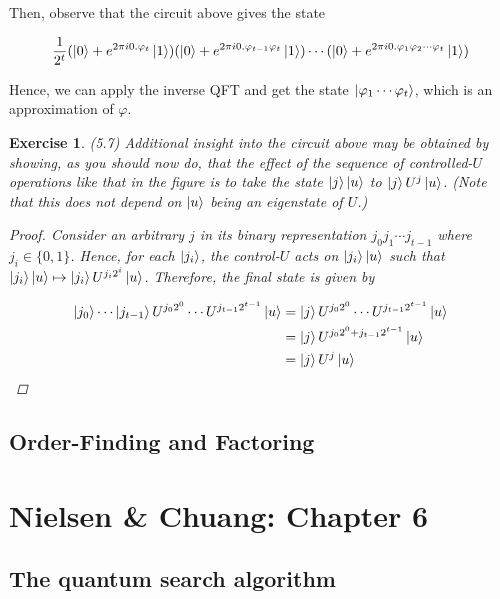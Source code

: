 \documentclass[11pt]{article}
\newcommand\0{\mathbf{0}}
\newcommand\<{\langle}
\renewcommand\>{\rangle}
\renewcommand\phi{\varphi}
\newtheorem{exercise}[theorem]{Exercise}
\begin{document}
Then, observe that the circuit above gives the state 

\begin{align*}
\frac{1}{2^t}(\ket{0} + e^{2 \pi i 0.\phi_t}\ket{1})(\ket{0} + e^{2 \pi i 0.\phi_{t-1}\phi_t}\ket{1})	\cdots (\ket{0} + e^{2 \pi i 0.\phi_1\phi_2\cdots\phi_t}\ket{1})	
\end{align*}

Hence, we can apply the inverse QFT and get the state $\ket{\phi_1 \cdots \phi_t}$, which is an approximation of $\phi$. 

\begin{exercise}(5.7) Additional insight into the circuit above may be obtained by showing, as you should now do, that the effect of the sequence of controlled-$U$ operations like that in the figure is to take the state $\ket{j}\ket{u}$ to $\ket{j} U^j\ket{u}$. (Note that this does not depend on $\ket{u}$ being an eigenstate of $U$.)
\begin{proof}
	Consider an arbitrary $j$ in its binary representation $j_0j_1 \cdots j_{t-1}$ where $j_i \in \{ 0, 1\}$. Hence, for each $\ket{j_i}$, the control-$U$ acts on $\ket{j_i}\ket{u}$ such that $\ket{j_i}\ket{u} \mapsto \ket{j_i}U^{j_i 2^i}\ket{u}$. Therefore, the final state is given by
	
	\begin{align*}
	\ket{j_0 } \cdots \ket{j_{t-1}}U^{j_0 2^0} \cdots U^{j_{t-1} 2^{t-1}}\ket{u} &= \ket{j} U^{j_0 2^0} \cdots U^{j_{t-1} 2^{t-1}}\ket{u} \\
	&= \ket{j} U^{j_0 2^0 + j_{t-1} 2^{t-1}}\ket{u} \\
	&= \ket{j} U^{j}\ket{u}
	\end{align*}
\end{proof}
\end{exercise}

\subsection{Order-Finding and Factoring}

\section{Nielsen \& Chuang: Chapter 6}

\subsection{The quantum search algorithm}
\end{document}

